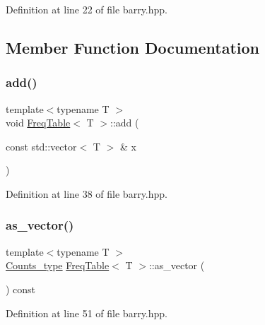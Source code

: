 Definition at line 22 of file barry.\+hpp.



\subsection{Member Function Documentation}
\mbox{\label{classbarry_1_1_freq_table_a919e08556ba3aa9535a64827315bb89a}} 
\subsubsection{\texorpdfstring{add()}{add()}}
{\footnotesize\ttfamily template$<$typename T $>$ \\
void \hyperlink{classbarry_1_1_freq_table}{Freq\+Table}$<$ T $>$\+::add (\begin{DoxyParamCaption}\item[{const std\+::vector$<$ T $>$ \&}]{x }\end{DoxyParamCaption})\hspace{0.3cm}{\ttfamily [inline]}}



Definition at line 38 of file barry.\+hpp.

\mbox{\label{classbarry_1_1_freq_table_a1898e62605d8753e170189936d403e05}} 
\subsubsection{\texorpdfstring{as\+\_\+vector()}{as\_vector()}}
{\footnotesize\ttfamily template$<$typename T $>$ \\
\hyperlink{namespacebarry_a3e2d8c3b6cf602107559d4237d9f1315}{Counts\+\_\+type} \hyperlink{classbarry_1_1_freq_table}{Freq\+Table}$<$ T $>$\+::as\+\_\+vector (\begin{DoxyParamCaption}{ }\end{DoxyParamCaption}) const\hspace{0.3cm}{\ttfamily [inline]}}



Definition at line 51 of file barry.\+hpp.

